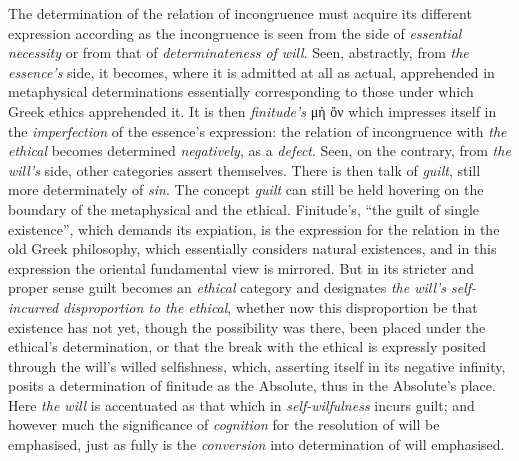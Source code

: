 \documentclass[12pt,a4paper]{book}
\begin{document}
The determination of the relation of incongruence must acquire its different
expression according as the incongruence is seen from the side of
\emph{essential necessity} or from that of \emph{determinateness of will}. Seen,
abstractly, from \emph{the essence's} side, it becomes, where it is admitted at
all as actual, apprehended in metaphysical determinations essentially
corresponding to those under which Greek ethics apprehended it. It is then
\emph{finitude's} μὴ ὄν which impresses itself in the \emph{imperfection} of the
essence's expression: the relation of incongruence with \emph{the ethical}
becomes determined \emph{negatively}, as a \emph{defect}. Seen, on the contrary,
from \emph{the will's} side, other categories assert themselves. There is then
talk of \emph{guilt}, still more determinately of \emph{sin}. The concept
\emph{guilt} can still be held hovering on the boundary of the metaphysical and
the ethical. Finitude's, ``the guilt of single existence'', which demands its
expiation, is the expression for the relation in the old Greek philosophy, which
essentially considers natural existences, and in this expression the oriental
fundamental view is mirrored. But in its stricter and proper sense guilt becomes
an \emph{ethical} category and designates \emph{the will's self-incurred
disproportion to the ethical}, whether now this disproportion be that existence
has not yet, though the possibility was there, been placed under the ethical's
determination, or that the break with the ethical is expressly posited through
the will's willed selfishness, which, asserting itself in its negative infinity,
posits a determination of finitude as the Absolute, thus in the Absolute's
place. Here \emph{the will} is accentuated as that which in \emph{self-wilfulness}
incurs guilt; and however much the significance of \emph{cognition} for the
resolution of will be emphasised, just as fully is the \emph{conversion} into
determination of will emphasised.
\end{document}
